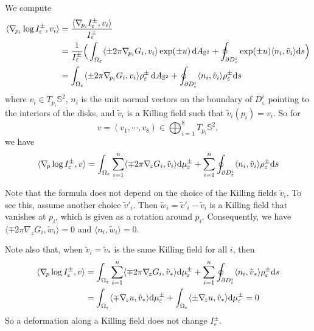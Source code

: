 \documentclass[a4paper]{amsart}
\newcommand{\uS}{\mathbb{S}}
\newcommand{\sph}{{\uS^2}}
\newcommand{\dd}{{\rm d}}
\theoremstyle{plain} %
\theoremstyle{definition} %
\theoremstyle{remark}
\begin{document}
We compute
\begin{align*}
	\langle \nabla_{\! p_i} \log I^\pm_\varepsilon, v_i\rangle &=
	\frac{\langle \nabla_{\! p_i} I^\pm_\varepsilon, v_i\rangle}{I^\pm_\varepsilon}
	\\ &=
	\frac{1}{I^\pm_\varepsilon}
	\Big(
		\int_{\Omega_\varepsilon} \langle \pm 2\pi \nabla_{\! p_i} G_i, v_i \rangle \exp(\pm u) \, \dd A_\sph
		+ \oint_{\partial D^i_\varepsilon} \exp(\pm u) \langle n_i, \tilde v_i \rangle \dd s
	\Big)
	\\ &=
	\int_{\Omega_\varepsilon} \langle \pm 2\pi \nabla_{\! p_i} G_i, v_i \rangle \rho_\varepsilon^\pm \, \dd A_\sph
	+ \oint_{\partial D^i_\varepsilon} \langle n_i, \tilde v_i \rangle \rho_\varepsilon^\pm \dd s
\end{align*}
where $v_i \in T_{p_i} \uS^2$, $n_i$ is the unit normal vectors on the boundary
of $D^i_\varepsilon$ pointing to the interiors of the disks, and $\tilde v_i$
is a Killing field such that $\tilde v_i (p_i) = v_i$. So for
\[
	v = (v_1, \cdots, v_8) \in \bigoplus_{i=1}^8 T_{p_i} \uS^2,
\]
we have
\begin{equation}\label{eq:grad}
	\langle \nabla_{\! p} \log I^\pm_\varepsilon, v\rangle 
	= \int_{\Omega_\varepsilon} \sum_{i=1}^n \langle \mp 2\pi \nabla_{\! z} G_i, \tilde v_i \rangle \dd\mu_\varepsilon^\pm
	+ \sum_{i=1}^n \oint_{\partial D^i_\varepsilon} \langle n_i, \tilde v_i \rangle \rho_\varepsilon^\pm \dd s
\end{equation}

Note that the formula does not depend on the choice of the Killing fields
$\tilde v_i$.  To see this, assume another choice $\tilde v'_i$.  Then $\tilde
w_i = \tilde v'_i - \tilde v_i$ is a Killing field that vanishes at $p_i$,
which is given as a rotation around $p_i$.  Consequently, we have $\langle \mp
2\pi \nabla_{\! z} G_i, \tilde w_i \rangle = 0$ and $\langle n_i, \tilde w_i
\rangle = 0$.

Note also that, when $\tilde v_i = \tilde v_*$ is the same Killing field for all
$i$, then
\begin{align*}
	\langle \nabla_{\! p} \log I^\pm_\varepsilon, v\rangle 
	&= \int_{\Omega_\varepsilon} \sum_{i=1}^n \langle \mp 2\pi \nabla_{\! z} G_i, \tilde v_* \rangle \dd\mu_\varepsilon^\pm
	+ \sum_{i=1}^n \oint_{\partial D^i_\varepsilon} \langle n_i, \tilde v_* \rangle \rho_\varepsilon^\pm \dd s\\
	&= \int_{\Omega_\varepsilon} \langle \mp \nabla_{\! z} u, \tilde v_* \rangle \dd\mu_\varepsilon^\pm
	+ \int_{\Omega_\varepsilon} \langle \pm \nabla_{\! z} u, \tilde v_* \rangle \dd \mu_\varepsilon^\pm = 0
\end{align*}
So a deformation along a Killing field does not change $I^\pm_\varepsilon$.
\end{document}
